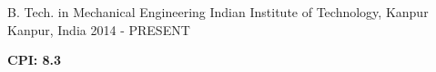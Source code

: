

\begin{cventries}

  \cventry
    {B. Tech. in Mechanical Engineering} %
    {Indian Institute of Technology, Kanpur} %
    {Kanpur, India} %
    {2014 - PRESENT} %
    {
        \begin{cvitems}
            \item{\textbf{CPI: 8.3}}
        \end{cvitems}
    }




\end{cventries}
